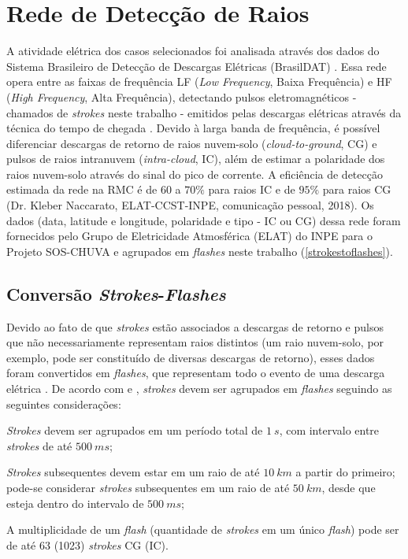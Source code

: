 \newpage

\section{Rede de Detecção de Raios}\label{raios}

A atividade elétrica dos casos selecionados foi analisada através dos dados do Sistema Brasileiro de Detecção de Descargas Elétricas (BrasilDAT) \cite{Naccarato2014}. Essa rede opera entre as faixas de frequência LF (\textit{Low Frequency}, Baixa Frequência) e HF (\textit{High Frequency}, Alta Frequência), detectando pulsos eletromagnéticos - chamados de \textit{strokes} neste trabalho - emitidos pelas descargas elétricas através da técnica do tempo de chegada \cite{Lewis1960}. Devido à larga banda de frequência, é possível diferenciar descargas de retorno de raios nuvem-solo (\textit{cloud-to-ground}, CG) e pulsos de raios intranuvem (\textit{intra-cloud}, IC), além de estimar a polaridade dos raios nuvem-solo através do sinal do pico de corrente. A eficiência de detecção estimada da rede na RMC é de $60$ a $70\%$ para raios IC e de $95\%$ para raios CG (Dr. Kleber Naccarato, ELAT-CCST-INPE, comunicação pessoal, 2018). Os dados (data, latitude e longitude, polaridade e tipo - IC ou CG) dessa rede foram fornecidos pelo Grupo de Eletricidade Atmosférica (ELAT) do INPE para o Projeto SOS-CHUVA e agrupados em \textit{flashes} neste trabalho (\autoref{strokestoflashes}).

\subsection{Conversão \textit{Strokes}-\textit{Flashes}}\label{strokestoflashes}

Devido ao fato de que \textit{strokes} estão associados a descargas de retorno e pulsos que não necessariamente representam raios distintos (um raio nuvem-solo, por exemplo, pode ser constituído de diversas descargas de retorno), esses dados foram convertidos em \textit{flashes}, que representam todo o evento de uma descarga elétrica \cite{MacGorman1998b}. De acordo com  e , \textit{strokes} devem ser agrupados em \textit{flashes} seguindo as seguintes considerações:

\begin{alineas}
	\item \textit{Strokes} devem ser agrupados em um período total de $1\:s$, com intervalo entre \textit{strokes} de até $500\:ms$;
	\item \textit{Strokes} subsequentes devem estar em um raio de até $10\:km$ a partir do primeiro; pode-se considerar \textit{strokes} subsequentes em um raio de até $50\:km$, desde que esteja dentro do intervalo de $500\:ms$;
	\item A multiplicidade de um \textit{flash} (quantidade de \textit{strokes} em um único \textit{flash}) pode ser de até 63 (1023) \textit{strokes} CG (IC).
\end{alineas} 

